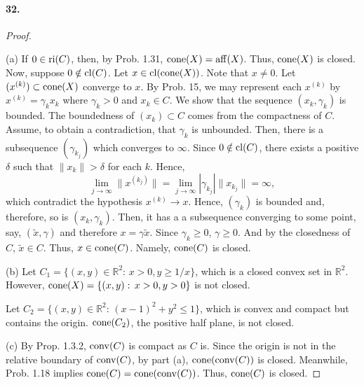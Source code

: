   \paragraph{32.}
  \begin{proof}
    $\,$\par
    (a) If $0\in\operatorname{ri}(C)$, then, by Prob. 1.31, $\operatorname{cone}(X)=\operatorname{aff}(X)$. Thus, $\operatorname{cone}
    (X)$ is closed. Now, suppose $0\notin\operatorname{cl}(C)$. Let $x\in\operatorname{cl}(\operatorname{cone}(X))$. Note
    that $x\ne 0$. Let $(x^{(k)})\subset\operatorname{cone}(X)$ converge to $x$. By Prob. 15,
    we may represent each $x^{(k)}$ by $x^{(k)}=\gamma_kx_k$ where $\gamma_k
    >0$ and $x_k\in C$. We show that the sequence $(x_k,\gamma_k)$ is bounded.
    The boundedness of $(x_k)\subset C$ comes from the compactness of $C$. 
    Assume, to obtain a contradiction, that $\gamma_k$ is unbounded. Then, 
    there is a subsequence $(\gamma_{k_j})$ which converges to $\infty$. Since
    $0\notin\operatorname{cl}(C)$, there exists a positive $\delta$ such that $\|x_k\|>
    \delta$ for each $k$. Hence,
    \[
      \lim_{j\to\infty}\|x^{(k_j)}\|=
      \lim_{j\to\infty}|\gamma_{k_j}|\|x_{k_j}\|=\infty,
    \]
    which contradict the hypothesis $x^{(k)}\to x$. Hence, $(\gamma_k)$ is 
    bounded and, therefore, so is $(x_k,\gamma_k)$. Then, it has a a 
    subsequence converging to some point, say, $(\tilde{x},\gamma)$ and 
    therefore $x=\gamma\tilde{x}$. Since $\gamma_k\ge 0$, $\gamma\ge 0$. And
    by the closedness of $C$, $\tilde{x}\in C$. Thus, $x\in\operatorname{cone}(C)$. Namely,
    $\operatorname{cone}(C)$ is closed.\par
    (b) Let $C_1=\{(x,y)\in\mathbb{R}^2:\, x>0,y\ge 1/x\}$, which is a closed
    convex set in $\mathbb{R}^2$. However, $\operatorname{cone}(X)=\{(x,y):\, x>0,y>0\}$ is
    not closed.\par
    Let $C_2=\{(x,y)\in\mathbb{R}^2:\, (x-1)^2+y^2\le 1\}$, which is convex and
    compact but contains the origin. $\operatorname{cone}(C_2)$, the positive half plane, is
    not closed.\par
    (c) By Prop. 1.3.2, $\operatorname{conv}(C)$ is compact as $C$ is. Since the origin is 
    not in the relative boundary of $\operatorname{conv}(C)$, by part (a), $\operatorname{cone}(\operatorname{conv}(C))$
    is closed. Meanwhile, Prob. 1.18 implies $\operatorname{cone}(C)=\operatorname{cone}(\operatorname{conv}(C))$. Thus,
    $\operatorname{cone}(C)$ is closed.
  \end{proof}
  
